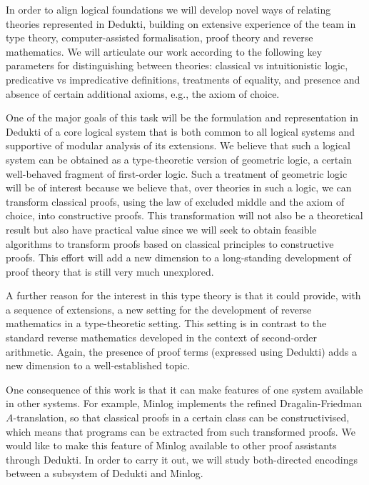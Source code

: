 In order to align logical foundations we will develop novel ways of
relating theories represented in Dedukti, building on extensive
experience of the team in type theory, computer-assisted
formalisation, proof theory and reverse mathematics. We will
articulate our work according to the following key parameters for
distinguishing between theories: classical vs intuitionistic logic,
predicative vs impredicative definitions, treatments of equality, and
presence and absence of certain additional axioms, e.g., the axiom of
choice.

One of the major goals of this task will be the formulation and
representation in Dedukti of a core logical system that is both common
to all logical systems and supportive of modular analysis of its
extensions. We believe that such a logical system can be obtained as a
type-theoretic version of geometric logic, a certain well-behaved
fragment of first-order logic.  Such a treatment of geometric logic
will be of interest because we
believe that, over theories in such a logic, we can transform
classical proofs, using the law of excluded middle and the axiom of
choice, into constructive proofs.  This transformation will not also be
a theoretical result but also have practical value since we 
will seek to obtain feasible algorithms to
transform proofs based on classical principles to constructive proofs.
This effort will add a new dimension to a long-standing development of
proof theory that is still very much unexplored.

A further reason for the interest in this type theory is that it could
provide, with a sequence of extensions, a new setting for the
development of reverse mathematics in a type-theoretic setting. This
setting is in contrast to the standard reverse mathematics developed
in the context of second-order arithmetic. Again, the presence of
proof terms (expressed using Dedukti) adds a new dimension to a
well-established topic.

One consequence of this work is that it can make features of one
system available in other systems. For example, Minlog implements the
refined Dragalin-Friedman $A$-translation, so that classical proofs in
a certain class can be constructivised, which means that programs can
be extracted from such transformed proofs.  We would like to make this
feature of Minlog available to other proof assistants through Dedukti.
In order to carry it out, we will study both-directed encodings
between a subsystem of Dedukti and Minlog.

